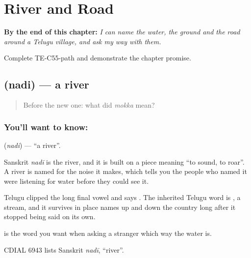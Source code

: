 
\chapter{River and Road}
\label{ch:te-river-road}

\begin{chapteropening}
\textbf{By the end of this chapter:} \emph{I can name the water, the ground and the road around a Telugu village, and ask my way with them.}

Complete TE-C55-path and demonstrate the chapter promise.
\end{chapteropening}

\section[\texorpdfstring{\te{నది} (nadi)}{నది (nadi)}]{ (nadi) — a river}

\label{lesson:TE-C55-river}



\begin{quote}
Before the new one: what did \emph{mokka} mean?
\end{quote}

\subsection*{You'll want to know: }
\textbf{} (\emph{nadi}) — \textquotedblleft{}a river\textquotedblright{}.

Sanskrit \emph{nadī} is the river, and it is built on a piece meaning \textquotedblleft{}to sound, to roar\textquotedblright{}. A river is named for the noise it makes, which tells you the people who named it were listening for water before they could see it.

Telugu clipped the long final vowel and says . The inherited Telugu word is , a stream, and it survives in place names up and down the country long after it stopped being said on its own.

 is the word you want when asking a stranger which way the water is.

CDIAL 6943 lists Sanskrit \emph{nadī}, \textquotedblleft{}river\textquotedblright{}.

